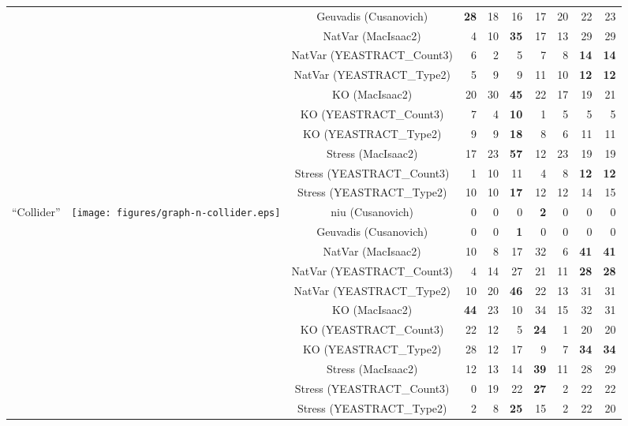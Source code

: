 \begin{table*}[t]
\begin{adjustbox}{max width=\textwidth}
\begin{tabular}{cccrrrrrrr}
  &   & Geuvadis (Cusanovich) & \textbf{28} & 18 & 16 & 17 & 20 & 22 & 23 \\
  &   & NatVar (MacIsaac2) & 4 & 10 & \textbf{35} & 17 & 13 & 29 & 29 \\
  &   & NatVar (YEASTRACT\_Count3) & 6 & 2 & 5 & 7 & 8 & \textbf{14} & \textbf{14} \\
  &   & NatVar (YEASTRACT\_Type2) & 5 & 9 & 9 & 11 & 10 & \textbf{12} & \textbf{12} \\
  &   & KO (MacIsaac2) & 20 & 30 & \textbf{45} & 22 & 17 & 19 & 21 \\
  &   & KO (YEASTRACT\_Count3) & 7 & 4 & \textbf{10} & 1 & 5 & 5 & 5 \\
  &   & KO (YEASTRACT\_Type2) & 9 & 9 & \textbf{18} & 8 & 6 & 11 & 11 \\
  &   & Stress (MacIsaac2) & 17 & 23 & \textbf{57} & 12 & 23 & 19 & 19 \\
  &   & Stress (YEASTRACT\_Count3) & 1 & 10 & 11 & 4 & 8 & \textbf{12} & \textbf{12} \\
  &   & Stress (YEASTRACT\_Type2) & 10 & 10 & \textbf{17} & 12 & 12 & 14 & 15 \\
\midrule
\multirow{11}{*}{``Collider''} & \multirow{11}{*}{\texttt{[image: figures/graph-n-collider.eps]}} & niu (Cusanovich) & 0 & 0 & 0 & \textbf{2} & 0 & 0 & 0 \\
  &   & Geuvadis (Cusanovich) & 0 & 0 & \textbf{1} & 0 & 0 & 0 & 0 \\
  &   & NatVar (MacIsaac2) & 10 & 8 & 17 & 32 & 6 & \textbf{41} & \textbf{41} \\
  &   & NatVar (YEASTRACT\_Count3) & 4 & 14 & 27 & 21 & 11 & \textbf{28} & \textbf{28} \\
  &   & NatVar (YEASTRACT\_Type2) & 10 & 20 & \textbf{46} & 22 & 13 & 31 & 31 \\
  &   & KO (MacIsaac2) & \textbf{44} & 23 & 10 & 34 & 15 & 32 & 31 \\
  &   & KO (YEASTRACT\_Count3) & 22 & 12 & 5 & \textbf{24} & 1 & 20 & 20 \\
  &   & KO (YEASTRACT\_Type2) & 28 & 12 & 17 & 9 & 7 & \textbf{34} & \textbf{34} \\
  &   & Stress (MacIsaac2) & 12 & 13 & 14 & \textbf{39} & 11 & 28 & 29 \\
  &   & Stress (YEASTRACT\_Count3) & 0 & 19 & 22 & \textbf{27} & 2 & 22 & 22 \\
  &   & Stress (YEASTRACT\_Type2) & 2 & 8 & \textbf{25} & 15 & 2 & 22 & 20 \\
\midrule

\end{tabular}
\end{adjustbox}
\end{table*}
